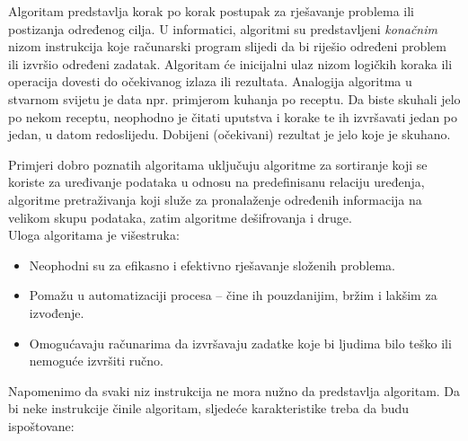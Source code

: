 Algoritam predstavlja  korak po korak postupak za rješavanje problema ili postizanja određenog cilja. U informatici, algoritmi su predstavljeni \textit{konačnim}  nizom instrukcija koje računarski program slijedi da bi riješio određeni problem ili izvršio određeni zadatak. Algoritam će inicijalni ulaz nizom logičkih koraka ili operacija dovesti do očekivanog izlaza ili rezultata.  Analogija algoritma u stvarnom svijetu je data npr.  primjerom kuhanja po receptu. Da biste skuhali jelo po nekom receptu, neophodno je čitati uputstva i korake te ih izvršavati jedan po jedan, u datom redoslijedu. Dobijeni (očekivani) rezultat je jelo koje je skuhano.  

 Primjeri dobro poznatih algoritama uključuju algoritme za sortiranje koji se koriste za uređivanje podataka u odnosu na predefinisanu relaciju  uređenja, algoritme pretraživanja koji služe za pronalaženje određenih infor\-macija na velikom skupu podataka, zatim algoritme dešifrovanja i druge.  \\

Uloga algoritama je višestruka:
\begin{itemize}
	\item   Neophodni su za efikasno i efektivno rješavanje složenih problema.
	
	\item  Pomažu u automatizaciji procesa -- čine ih pouzdanijim, bržim i lakšim za izvođenje.
	
	\item  Omogućavaju računarima da izvršavaju zadatke koje bi ljudima bilo teško ili nemoguće izvršiti ručno.
	
\end{itemize}
 Napomenimo da svaki niz instrukcija ne mora nužno da predstavlja algoritam. Da bi neke instrukcije činile algoritam, sljedeće karakteristike treba da budu ispoštovane:

